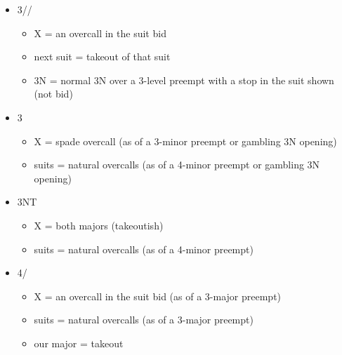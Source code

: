 \begin{itemize}
\item 3\clubs/\diamonds/\hearts
	\begin{itemize}
	\item X = an overcall in the suit bid
	\item next suit = takeout of that suit
	\item 3N = normal 3N over a 3-level preempt with a stop in the suit shown (not bid)
	\end{itemize}
\item 3\spades
	\begin{itemize}
	\item X = spade overcall (as of a 3-minor preempt or gambling 3N opening)
	\item suits = natural overcalls (as of a 4-minor preempt or gambling 3N opening)
	\end{itemize}
\item 3NT
	\begin{itemize}
	\item X = both majors (takeoutish)
	\item suits = natural overcalls (as of a 4-minor preempt)
	\end{itemize}
\item 4\clubs/\diamonds
	\begin{itemize}
	\item X = an overcall in the suit bid (as of a 3-major preempt)
	\item suits = natural overcalls (as of a 3-major preempt)
	\item our major = takeout
	\end{itemize}
\end{itemize}


